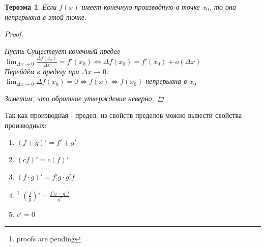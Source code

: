 \documentclass[oneside]{book}
\newtheorem{thm}{Тероэма}[chapter] %
\begin{document}
\begin{thm}
	Если $f(x)$ имеет конечную производную в точке $x_0$, то она непрерывна в этой точке.
  \begin{proof}
    \begin{center}
      Пусть Существует конечный предел \\
      $\lim_{\Delta x \rightarrow 0}{\frac{\Delta f(x_0)}{\Delta x }} = f'(x_0) \Leftrightarrow \Delta f(x_0) = f'(x_0)+o(\Delta x)$ \\
      Перейдём к пределу при $\Delta x \rightarrow 0$: \\
      $\lim_{\Delta x \rightarrow 0}{\Delta f(x_0)} = 0 \Leftrightarrow f(x) \Leftrightarrow f(x_0)$ непрерывна в $x_0$ \\
    \end{center}
    Заметим, что обратное утверждение неверно.
  \end{proof}
\end {thm}
Так как производная - предел, из свойств пределов можно вывести свойства производных:
\begin{enumerate}
  \item $(f \pm g)' = f' \pm g'$
  \item $(cf)' = c(f)'$
  \item $(f \cdot g)' = f'g \cdot g'f$
  \item\footnote{proofs are pending} $(\frac{f}{g})' = \frac{f'g - g'f}{g^2}$
  \item $c' = 0$
\end{enumerate}
\end{document}
